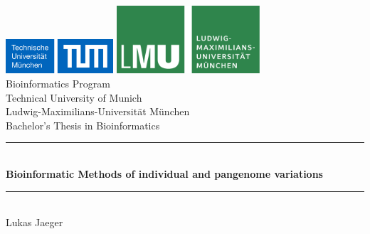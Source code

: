 \documentclass[a4paper,11pt,twoside,openright]{report}
\newcommand{\HRule}{\rule{\linewidth}{0.5mm}}
\begin{document}
\begin{titlepage}


\sffamily

\begin{center}


\includegraphics[width=0.3\textwidth]{pics/logo2}
\hfill
\includegraphics[width=0.4\textwidth]{pics/logo1}  
\\[5cm]

{\Large Bioinformatics Program}\\[0.5cm]
{\Large Technical University of Munich}\\[0.5cm]
{\Large Ludwig-Maximilians-Universit\"at M\"unchen}\\[2cm]
{\Large Bachelor's Thesis in Bioinformatics}\\[1.5cm]

\HRule \\[0.4cm]
{ \huge \bfseries Bioinformatic Methods of individual and pangenome variations}\\[0.4cm]

\HRule \\[1.5cm]

{\Large Lukas Jaeger}\\[2.5cm]

\vfill
\end{center}
\end{titlepage}
\pagestyle{empty}
\end{document}

